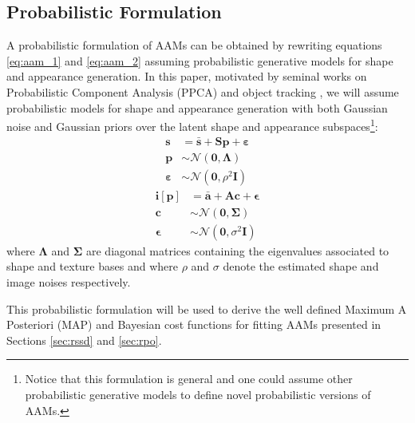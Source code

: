 \subsection{Probabilistic Formulation}
\label{sec:prob_aam}

A probabilistic formulation of AAMs can be obtained by rewriting equations \ref{eq:aam_1} and \ref{eq:aam_2} assuming probabilistic generative models for shape and appearance generation. In this paper, motivated by seminal works on Probabilistic Component Analysis (PPCA) and object tracking \cite{Tipping1999, Roweis1998, Moghaddam1997}, we will assume probabilistic models for shape and appearance generation with both Gaussian noise and Gaussian priors over the latent shape and appearance subspaces\footnote{Notice that this formulation is general and one could assume other probabilistic generative models \cite{vanderMaaten2010, Bach2005, Prince2012, Nicolau2014} to define novel probabilistic versions of AAMs.}:
\begin{equation}
	\begin{aligned}
		\mathbf{s} & = \bar{\mathbf{s}} + \mathbf{S} \mathbf{p} + \boldsymbol{\varepsilon}
		\\
		\mathbf{p} & \sim \mathcal{N} \left( \mathbf{0}, \mathbf{\Lambda} \right) 
		\\
		\boldsymbol{\varepsilon} & \sim \mathcal{N} \left( \mathbf{0}, \rho^2 \mathbf{I} \right) 
	\end{aligned}
\end{equation}
\begin{equation}
	\begin{aligned}
		\mathbf{i}[\mathbf{p}] & = \bar{\mathbf{a}} + \mathbf{A} \mathbf{c} + \boldsymbol{\epsilon}
		\\
		\mathbf{c} & \sim \mathcal{N} \left( \mathbf{0}, \mathbf{\Sigma} \right) 
		\\
		\boldsymbol{\epsilon} & \sim \mathcal{N} \left( \mathbf{0}, \sigma^2 \mathbf{I} \right) 
	\end{aligned}
\end{equation}
where $\mathbf{\Lambda}$ and $\mathbf{\Sigma}$ are diagonal matrices containing the eigenvalues associated to shape and texture bases and where $\rho$ and $\sigma$ denote the estimated shape and image noises respectively.

This probabilistic formulation will be used to derive the well defined Maximum A Posteriori (MAP) and Bayesian cost functions for fitting AAMs presented in Sections \ref{sec:rssd} and \ref{sec:rpo}.


